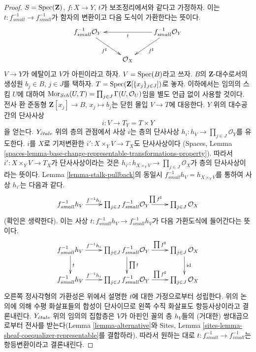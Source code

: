 \begin{proof}
\medskip\noindent
$S = \mathop{\mathrm{Spec}}(\mathbf{Z})$, $f : X \to Y$, $t$가 보조정리에서와 같다고
가정하자. 이는 $t : f^{-1}_{small} \to f^{-1}_{small}$가 함자의
변환이고 다음 도식이 가환한다는 뜻이다.
$$
\xymatrix{
f_{small}^{-1}\mathcal{O}_Y
\ar[rd]_{f^\sharp}  & &
f_{small}^{-1}\mathcal{O}_Y \ar[ll]^t \ar[ld]^{f^\sharp} \\
& \mathcal{O}_X
}
$$
$V \to Y$가 에탈이고 $V$가 아핀이라고 하자.
$V = \mathop{\mathrm{Spec}}(B)$라고 쓰자. $B$의 $\mathbf{Z}$-대수로서의 생성원
$b_j \in B$, $j \in J$를 택하자.
$T = \mathop{\mathrm{Spec}}(\mathbf{Z}[\{x_j\}_{j \in J}])$로 놓자. 이하에서는 임의의
스킴 $U$에 대하여
$\mathop{\mathrm{Mor}}\nolimits_{\mathit{Sch}}(U, T) = \prod_{j \in J} \Gamma(U, \mathcal{O}_U)$임을
별도 언급 없이 사용할 것이다. 전사 환 준동형
$\mathbf{Z}[x_j] \to B$, $x_j \mapsto b_j$는 닫힌 몰입
$V \to T$에 대응한다. $Y$ 위의 대수공간의 단사사상
$$
i : V \longrightarrow T_Y = T \times Y
$$
을 얻는다. $Y_{\acute{e}tale}$ 위의 층의 관점에서 사상 $i$는 층의 단사사상
$h_i : h_V \to \prod_{j \in J} \mathcal{O}_Y$를 유도한다.
$i$를 $X$로 기저변환한 $i' : X \times_Y V \to T_X$도 단사사상이다
(Spaces, Lemma
\ref{spaces-lemma-base-change-representable-transformations-property}).
따라서 $i' : X \times_Y V \to T_X$가 단사사상이라는 것은
$h_{i'} : h_{X \times_Y V} \to \prod_{j \in J} \mathcal{O}_X$가 층의
단사사상이라는 뜻이다. Lemma \ref{lemma-stalk-pullback}의 동일시
$f_{small}^{-1}h_V = h_{X \times_Y V}$를 통하여 사상 $h_{i'}$는
다음과 같다.
$$
\xymatrix{
f_{small}^{-1}h_V \ar[r]^-{f^{-1}h_i} &
\prod_{j \in J} f_{small}^{-1}\mathcal{O}_Y
\ar[r]^{\prod f^\sharp} &
\prod_{j \in J} \mathcal{O}_X
}
$$
(확인은 생략한다). 이는 사상
$t : f_{small}^{-1}h_V \to f_{small}^{-1}h_V$가 다음 가환도식에
들어간다는 뜻이다.
$$
\xymatrix{
f_{small}^{-1}h_V \ar[r]^-{f^{-1}h_i} \ar[d]^t &
\prod_{j \in J} f_{small}^{-1}\mathcal{O}_Y
\ar[r]^-{\prod f^\sharp} \ar[d]^{\prod t} &
\prod_{j \in J} \mathcal{O}_X \ar[d]^{\text{id}}\\
f_{small}^{-1}h_V \ar[r]^-{f^{-1}h_i} &
\prod_{j \in J} f_{small}^{-1}\mathcal{O}_Y
\ar[r]^-{\prod f^\sharp} &
\prod_{j \in J} \mathcal{O}_X
}
$$
오른쪽 정사각형의 가환성은 위에서 설명한 $t$에 대한 가정으로부터
성립한다. 위의 논의에 의해 수평 화살표들의 합성이 단사이므로 왼쪽
수직 화살표도 항등사상이라고 결론내린다. $Y_{\acute{e}tale}$ 위의 임의의
집합층은 $V$가 아핀인 꼴의 층 $h_V$들의 (거대한) 쌍대곱으로부터
전사를 받는다(Lemma \ref{lemma-alternative}와 Sites, Lemma
\ref{sites-lemma-sheaf-coequalizer-representable}를 결합하라).
따라서 원하는 대로 $t : f_{small}^{-1} \to f_{small}^{-1}$는
항등변환이라고 결론내린다.
\end{proof}

